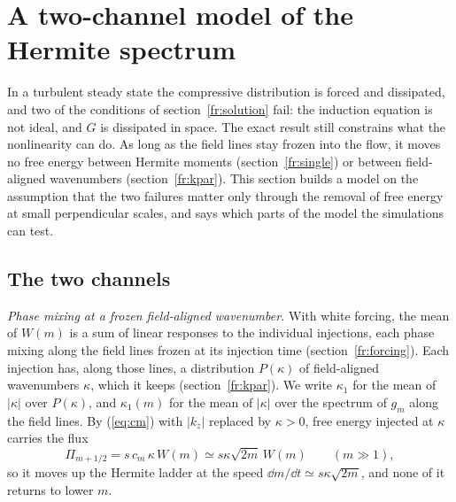 \section{A two-channel model of the Hermite spectrum}\label{sec:twochannel}

In a turbulent steady state the compressive distribution is forced and dissipated, and two of the conditions of section~\ref{fr:solution} fail: the induction equation is not ideal, and $G$ is dissipated in space. The exact result still constrains what the nonlinearity can do. As long as the field lines stay frozen into the flow, it moves no free energy between Hermite moments (section~\ref{fr:single}) or between field-aligned wavenumbers (section~\ref{fr:kpar}). This section builds a model on the assumption that the two failures matter only through the removal of free energy at small perpendicular scales, and says which parts of the model the simulations can test.

\subsection{The two channels}\label{tc:channels}

\emph{Phase mixing at a frozen field-aligned wavenumber.} With white forcing, the mean of $W(m)$ is a sum of linear responses to the individual injections, each phase mixing along the field lines frozen at its injection time (section~\ref{fr:forcing}). Each injection has, along those lines, a distribution $P(\kappa)$ of field-aligned wavenumbers $\kappa$, which it keeps (section~\ref{fr:kpar}). We write $\kappa_1$ for the mean of $|\kappa|$ over $P(\kappa)$, and $\kappa_1(m)$ for the mean of $|\kappa|$ over the spectrum of $g_m$ along the field lines. By (\ref{eq:cm}) with $|k_z|$ replaced by $\kappa>0$, free energy injected at $\kappa$ carries the flux
\begin{equation}\label{eq:pmflux}
  \Pi_{m+1/2}=s\,c_m\,\kappa\,W(m)\simeq s\kappa\sqrt{2m}\,W(m)\qquad(m\gg1),
\end{equation}
so it moves up the Hermite ladder at the speed $\dd m/\dd t\simeq s\kappa\sqrt{2m}$, and none of it returns to lower $m$.

